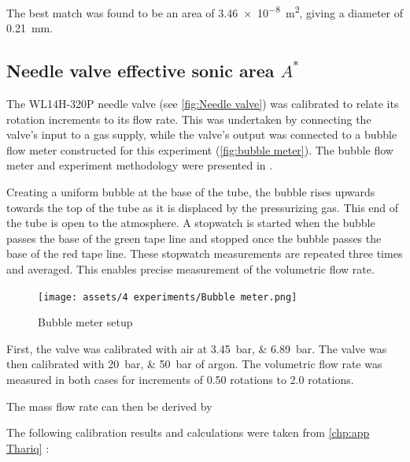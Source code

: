             The best match was found to be an area of \qty{3.46e-8}{m^2}, giving a diameter of \qty{0.21}{mm}.

        \subsection{Needle valve effective sonic area $A^*$}

            The WL14H-320P needle valve (see \autoref{fig:Needle valve}) was calibrated to relate its rotation increments to its flow rate. This was undertaken by connecting the valve's input to a gas supply, while the valve's output was connected to a bubble flow meter constructed for this experiment (\autoref{fig:bubble meter}). The bubble flow meter and experiment methodology were presented in \textcite{barigouFluidMechanicsSoap1993}.

            Creating a uniform bubble at the base of the tube, the bubble rises upwards towards the top of the tube as it is displaced by the pressurizing gas. This end of the tube is open to the atmosphere. A stopwatch is started when the bubble passes the base of the green tape line and stopped once the bubble passes the base of the red tape line. These stopwatch measurements are repeated three times and averaged. This enables precise measurement of the volumetric flow rate.

            \begin{figure}[!ht]
                \centering
                \texttt{[image: assets/4 experiments/Bubble meter.png]}
                \caption{Bubble meter setup}
                \label{fig:bubble meter}
            \end{figure}

            First, the valve was calibrated with air at \qtylist{3.45;6.89}{bar}. The valve was then calibrated with \qtylist{20;50}{bar} of argon. The volumetric flow rate was measured in both cases for increments of 0.50 rotations to 2.0 rotations.

            The mass flow rate can then be derived by 

            The following calibration results and calculations were taken from \autoref{chp:app Thariq} :

